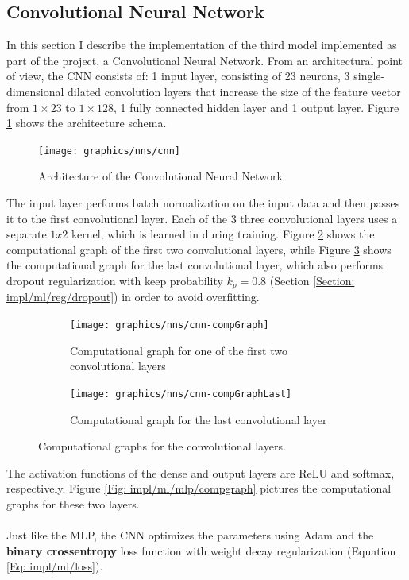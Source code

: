 	\subsection{Convolutional Neural Network} \label{Section: impl/ml/cnn}
	In this section I describe the implementation of the third model implemented as part of the project, a Convolutional Neural Network. From an architectural point of view, the CNN consists of: 1 input layer, consisting of 23 neurons, 3 single-dimensional dilated convolution layers that increase the size of the feature vector from $1\times23$ to $1\times128$, 1 fully connected hidden layer and 1 output layer. Figure \ref{Fig: impl/ml/cnn/architecture} shows the architecture schema. 
	\begin{figure}[H]
		\centering
		\texttt{[image: graphics/nns/cnn]}
		\caption{Architecture of the Convolutional Neural Network}
		\label{Fig: impl/ml/cnn/architecture}
	\end{figure}
	The input layer performs batch normalization on the input data and then passes it to the first convolutional layer. Each of the 3 three convolutional layers uses a separate $1x2$ kernel, which is learned in during training. Figure \ref{Fig: impl/ml/cnn/compGraph} shows the computational graph of the first two convolutional layers, while Figure \ref{Fig: impl/ml/cnn/compGraphLast} shows the computational graph for the last convolutional layer, which also performs dropout regularization with keep probability $k_p = 0.8$ (Section \ref{Section: impl/ml/reg/dropout}) in order to avoid overfitting. 
	\begin{figure}[H]
		\centering
		\begin{subfigure}[b]{.4\textwidth}
			\centering
			\texttt{[image: graphics/nns/cnn-compGraph]}
			\caption{Computational graph for one of the first two convolutional layers}
			\label{Fig: impl/ml/cnn/compGraph}
		\end{subfigure}
		\hfill
		\begin{subfigure}[b]{.4\textwidth}
			\centering
			\texttt{[image: graphics/nns/cnn-compGraphLast]}
			\caption{Computational graph for the last convolutional layer}
			\label{Fig: impl/ml/cnn/compGraphLast}
		\end{subfigure}
		\caption{Computational graphs for the convolutional layers.}
		\label{Fig: impl/ml/cnn/compGraphs}
	\end{figure}
	The activation functions of the dense and output layers are ReLU and softmax, respectively. Figure \ref{Fig: impl/ml/mlp/compgraph} pictures the computational graphs for these two layers. 
	\\ \\
	Just like the MLP, the CNN optimizes the parameters using Adam and the \textbf{binary crossentropy} loss function with weight decay regularization (Equation \ref{Eq: impl/ml/loss}).
